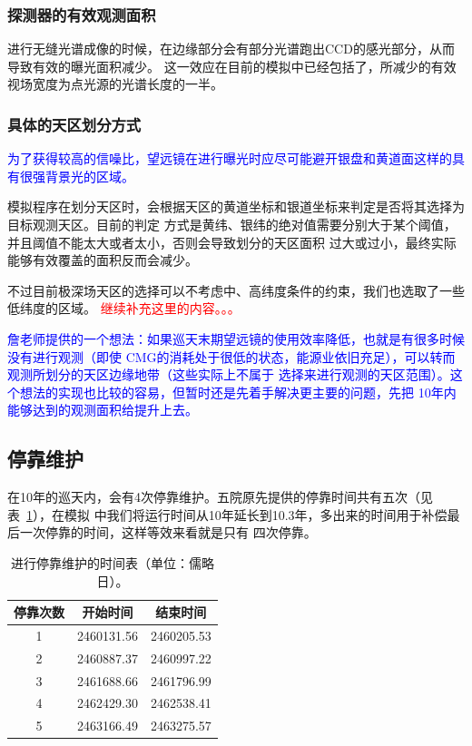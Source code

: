 \documentclass[a4paper,11pt]{ctexart}
\newcommand{\RT}[1]{\textcolor{red}{#1}}
\newcommand{\BT}[1]{\textcolor{blue}{#1}}
\begin{document}
\subsubsection{探测器的有效观测面积}

进行无缝光谱成像的时候，在边缘部分会有部分光谱跑出CCD的感光部分，从而导致有效的曝光面积减少。
这一效应在目前的模拟中已经包括了，所减少的有效视场宽度为点光源的光谱长度的一半。

\subsubsection{具体的天区划分方式}

\BT{\heiti 为了获得较高的信噪比，望远镜在进行曝光时应尽可能避开银盘和黄道面这样的具有很强背景光的区域。}

模拟程序在划分天区时，会根据天区的黄道坐标和银道坐标来判定是否将其选择为目标观测天区。目前的判定
方式是黄纬、银纬的绝对值需要分别大于某个阈值，并且阈值不能太大或者太小，否则会导致划分的天区面积
过大或过小，最终实际能够有效覆盖的面积反而会减少。

不过目前极深场天区的选择可以不考虑中、高纬度条件的约束，我们也选取了一些低纬度的区域。
\RT{继续补充这里的内容。。。}

\BT{詹老师提供的一个想法：如果巡天末期望远镜的使用效率降低，也就是有很多时候没有进行观测（即使
CMG的消耗处于很低的状态，能源业依旧充足），可以转而观测所划分的天区边缘地带（这些实际上不属于
选择来进行观测的天区范围）。这个想法的实现也比较的容易，但暂时还是先着手解决更主要的问题，先把
10年内能够达到的观测面积给提升上去。}

\subsection{停靠维护}
在10年的巡天内，会有4次停靠维护。五院原先提供的停靠时间共有五次（见表~\ref{tab:stoptime}），在模拟
中我们将运行时间从10年延长到10.3年，多出来的时间用于补偿最后一次停靠的时间，这样等效来看就是只有
四次停靠。

\begin{table}[h!]
\renewcommand{\arraystretch}{1}
\centering
\begin{tabular}{c|c|c}
\toprule
停靠次数 & 开始时间 & 结束时间 \\
\hline
1 & 2460131.56 & 2460205.53 \\
\hline
2 & 2460887.37 & 2460997.22 \\
\hline
3 & 2461688.66 & 2461796.99 \\
\hline
4 & 2462429.30 & 2462538.41 \\
\hline
5 & 2463166.49 & 2463275.57 \\
\bottomrule
\end{tabular}
\caption{进行停靠维护的时间表（单位：儒略日）。}
\label{tab:stoptime}
\end{table}
\end{document}

